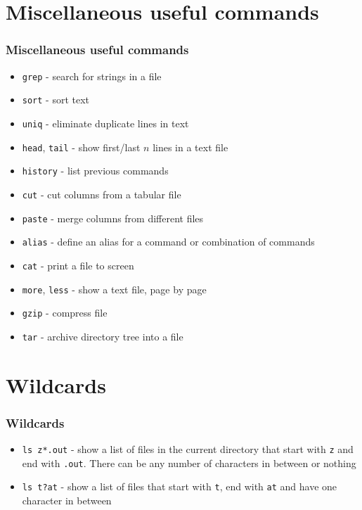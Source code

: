 \documentclass{beamer}
\begin{document}
\section{Miscellaneous useful commands}
\begin{frame}[fragile]
  \frametitle{Miscellaneous useful commands}
\begin{itemize}
\item  {\color{mycolorcli}\verb|grep|} - search for strings in a file
\item {\color{mycolorcli}\verb|sort|} - sort text
\item {\color{mycolorcli}\verb|uniq|} - eliminate duplicate lines in text
\item {\color{mycolorcli}\verb|head|}, {\color{mycolorcli}\verb|tail|} - show first/last $n$ lines in a text file 
\item {\color{mycolorcli}\verb|history|} - list previous commands
\item {\color{mycolorcli}\verb|cut|} - cut columns from a tabular file
\item {\color{mycolorcli}\verb|paste|} - merge columns from different files
\item {\color{mycolorcli}\verb|alias|} - define an alias for a command or combination of commands
\item {\color{mycolorcli}\verb|cat|} - print a file to screen
\item {\color{mycolorcli}\verb|more|}, {\color{mycolorcli}\verb|less|} - show a text file, page by page
\item {\color{mycolorcli}\verb|gzip|} - compress file
\item {\color{mycolorcli}\verb|tar|} - archive directory tree into a file
\end{itemize}
\end{frame}

\section{Wildcards}
\begin{frame}[fragile]
  \frametitle{Wildcards}
  \begin{itemize}
  \item {\color{mycolorcli}\verb|ls z*.out|} - show a list of files in the current directory that start with
    {\color{mycolorcli}\verb|z|} and end with {\color{mycolorcli}\verb|.out|}. There can be any number of characters
    in between or nothing
  \item {\color{mycolorcli}\verb|ls t?at|} - show a list of files that start with {\color{mycolorcli}\verb|t|},
    end with {\color{mycolorcli}\verb|at|} and have one character in between
  \end{itemize}
\end{frame}
\end{document}
